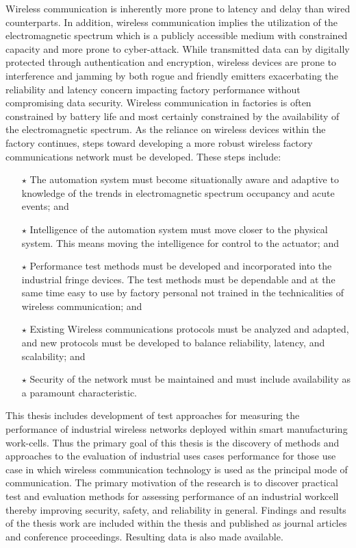 \documentclass{article}
\begin{document}
Wireless communication is inherently more prone to latency and delay than wired counterparts.  In addition, wireless communication implies the utilization of the electromagnetic spectrum which is a publicly accessible medium with constrained capacity and more prone to cyber-attack.  While transmitted data can by digitally protected through authentication and encryption, wireless devices are prone to interference and jamming by both rogue and friendly emitters exacerbating the reliability and latency concern impacting factory performance without compromising data security.  Wireless communication in factories is often constrained by battery life and most certainly constrained by the availability of the electromagnetic spectrum.   As the reliance on wireless devices within the factory continues, steps toward developing a more robust wireless factory communications network must be developed. These steps include:

\begin{itemize}
	\item[$\star$] The automation system must become situationally aware and adaptive to knowledge of the trends in electromagnetic spectrum occupancy and acute events; and
	
	\item[$\star$] Intelligence of the automation system must move closer to the physical system.  This means moving the intelligence for control to the actuator; and  
	
	\item[$\star$] Performance test methods must be developed and incorporated into the industrial fringe devices.  The test methods must be dependable and at the same time easy to use by factory personal not trained in the technicalities of wireless communication; and
	
	\item[$\star$] Existing Wireless communications protocols must be analyzed and adapted, and new protocols must be developed to balance reliability, latency, and scalability; and
	 
	\item[$\star$] Security of the network must be maintained and must include availability as a paramount characteristic.
\end{itemize}

This thesis includes development of test approaches for measuring the performance of industrial wireless networks deployed within smart manufacturing work-cells.  Thus the primary goal of this thesis is the discovery of methods and approaches to the evaluation of industrial uses cases performance for those use case in which wireless communication technology is used as the principal mode of communication.  The primary motivation of the research is to discover practical test and evaluation methods for assessing performance of an industrial workcell thereby improving security, safety, and reliability in general.   Findings and results of the thesis work are included within the thesis and published as journal articles and conference proceedings.  Resulting data is also made available.
\end{document}

